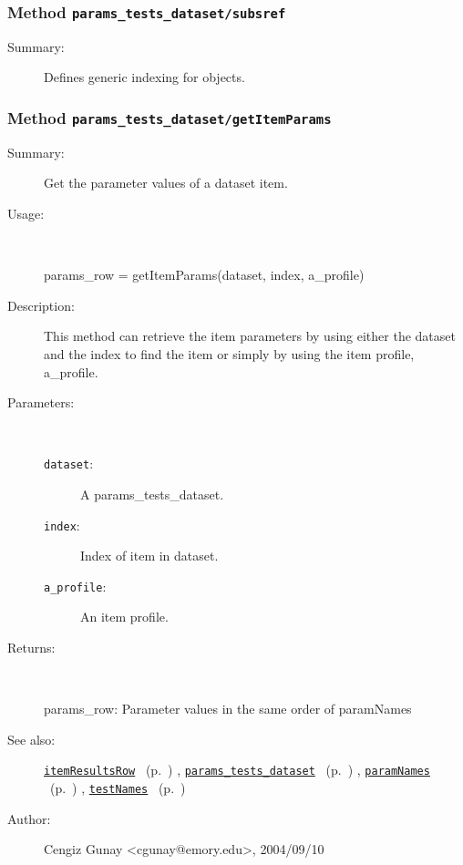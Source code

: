 \subsubsection[Method \texttt{subsref}]{Method \texttt{params\_tests\_dataset/subsref}}%
%
\label{ref_params_tests_dataset__subsref}%
\hypertarget{ref_params_tests_dataset__subsref}{}%
\begin{description}
\item[Summary:]Defines generic indexing for objects.
%
%
%
%
%
%
%
%
\end{description}
\methodline%
\subsubsection[Method \texttt{getItemParams}]{Method \texttt{params\_tests\_dataset/getItemParams}}%
%
\label{ref_params_tests_dataset__getItemParams}%
\hypertarget{ref_params_tests_dataset__getItemParams}{}%
\begin{description}
\item[Summary:]Get the parameter values of a dataset item.
%
\item[Usage:]~%
\begin{lyxcode}%
params\_row = getItemParams(dataset, index, a\_profile)
%
\end{lyxcode}%
%
\item[Description:]%
This method can retrieve the item parameters by using either the 
 dataset and the index to find the item or simply by using
 the item profile, a\_profile.
\item[Parameters:]~
\begin{description}%
\item[\texttt{dataset}:]
 A params\_tests\_dataset.
\item[\texttt{index}:]
 Index of item in dataset.
\item[\texttt{a\_profile}:]
 An item profile.
\end{description}%
%
\item[Returns:]~

	params\_row: Parameter values in the same order of paramNames
%
%
\item[See also:]%
\hyperlink{ref_itemResultsRow}{\texttt{itemResultsRow}}%
\ (p.~\pageref{ref_itemResultsRow})%
%
, \hyperlink{ref_params_tests_dataset}{\texttt{params\_tests\_dataset}}%
\ (p.~\pageref{ref_params_tests_dataset})%
%
, \hyperlink{ref_paramNames}{\texttt{paramNames}}%
\ (p.~\pageref{ref_paramNames})%
%
, \hyperlink{ref_testNames}{\texttt{testNames}}%
\ (p.~\pageref{ref_testNames})%
%
%
\item[Author:]%
Cengiz Gunay <cgunay@emory.edu>, 2004/09/10%
\end{description}
\methodline%

